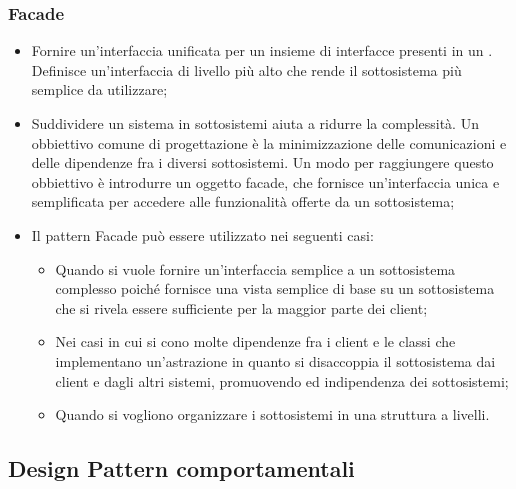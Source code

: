 \subsubsection{Facade}
\begin{itemize}
\item {} Fornire un'interfaccia unificata per un insieme di interfacce presenti in un . Definisce un'interfaccia di livello più alto che rende il sottosistema più semplice da utilizzare;
\item {} Suddividere un sistema in sottosistemi aiuta a ridurre la complessità. Un obbiettivo comune di progettazione è la minimizzazione delle comunicazioni e delle dipendenze fra i diversi sottosistemi. Un modo per raggiungere questo obbiettivo è introdurre un oggetto facade, che fornisce un'interfaccia unica e semplificata per accedere alle funzionalità offerte da un sottosistema;
\item {} Il pattern Facade può essere utilizzato nei seguenti casi:
\begin{itemize}
\item Quando si vuole fornire un'interfaccia semplice a un sottosistema complesso poiché fornisce una vista semplice di base su un sottosistema che si rivela essere sufficiente per la maggior parte dei client;
\item Nei casi in cui si cono molte dipendenze fra i client e le classi che implementano un'astrazione in quanto si disaccoppia il sottosistema dai client e dagli altri sistemi, promuovendo  ed indipendenza dei sottosistemi;
\item Quando si vogliono organizzare i sottosistemi in una struttura a livelli.
\end{itemize}
\end{itemize}

\subsection{Design Pattern comportamentali} %
